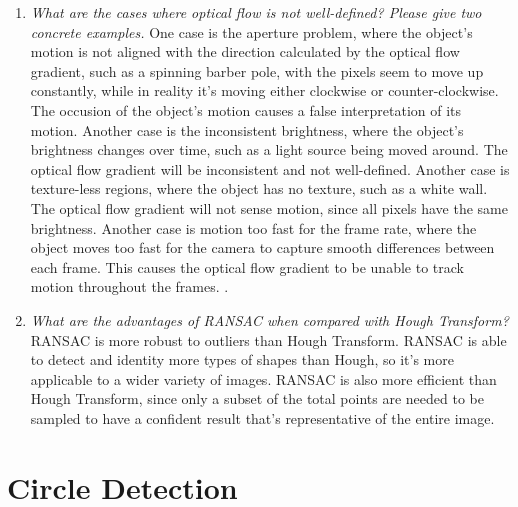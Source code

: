 \documentclass[11pt]{article}
\begin{document}
\begin{enumerate}
    \item \textit{What are the cases where optical flow is not well-defined? Please give two concrete examples.}\newline
    One case is the aperture problem, where the object's motion is not aligned with the direction calculated by the
    optical flow gradient, such as a spinning barber pole, with the pixels seem to move up constantly, while in
    reality it's moving either clockwise or counter-clockwise. The occusion of the object's motion causes a false
    interpretation of its motion.\newline
    Another case is the inconsistent brightness, where the object's brightness changes over time, such as a
    light source being moved around. The optical flow gradient will be inconsistent and not well-defined.\newline
    Another case is texture-less regions, where the object has no texture, such as a white wall. The optical flow
    gradient will not sense motion, since all pixels have the same brightness.\newline
    Another case is motion too fast for the frame rate, where the object moves too fast for the camera to capture
    smooth differences between each frame. This causes the optical flow gradient to be unable to track motion
    throughout the frames.\newline
    .\newline

    \item \textit{What are the advantages of RANSAC when compared with Hough Transform?}\newline
    RANSAC is more robust to outliers than Hough Transform. RANSAC is able to detect and identity more types of
    shapes than Hough, so it's more applicable to a wider variety of images. RANSAC is also more efficient than Hough
    Transform, since only a subset of the total points are needed to be sampled to have a confident result that's
    representative of the entire image.\newline

    \end{enumerate}

    \section{Circle Detection}
\end{document}
